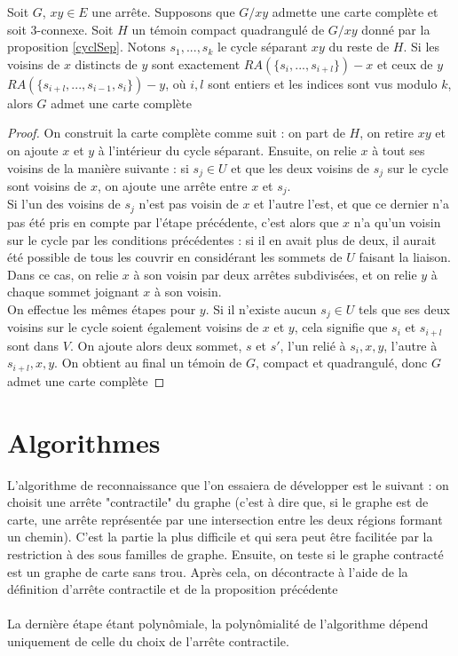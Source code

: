 \documentclass{scrartcl}
\begin{document}
\begin{flushleft}
\begin{prop}\label{ezDecontr}
    Soit $G$, $xy \in E$ une arrête. Supposons que $G / xy$ admette une carte complète et soit $3$-connexe. Soit $H$ un témoin compact
    quadrangulé de $G / xy$ donné par la proposition \ref{cyclSep}. Notons $s_1, ..., s_k$ le cycle séparant $xy$ du reste de $H$.
    Si les voisins de $x$ distincts de $y$ sont exactement $RA(\{s_i, ..., s_{i+l}\}) - x$ et ceux de $y$
    $RA(\{s_{i+l}, ..., s_{i-1}, s_i\}) - y$,
    où $i, l$ sont entiers et les indices sont vus modulo $k$, alors $G$ admet une carte complète
\end{prop}

\begin{proof}
    On construit la carte complète comme suit : on part de $H$, on retire $xy$ et on ajoute $x$ et $y$ à l'intérieur du cycle séparant.
    Ensuite, on relie $x$ à tout ses voisins de la manière suivante : si $s_j \in U$ et que les deux voisins de $s_j$ sur le cycle
    sont voisins de $x$, on ajoute une arrête entre $x$ et $s_j$.\\
    Si l'un des voisins de $s_j$ n'est pas voisin de $x$ et l'autre l'est,
    et que ce dernier n'a pas été pris en compte par l'étape précédente, c'est alors que $x$ n'a qu'un voisin sur le cycle par
    les conditions précédentes : si il en avait plus de deux, il aurait été possible de tous les couvrir en considérant les sommets
    de $U$ faisant la liaison. Dans ce cas, on relie $x$ à son voisin par deux arrêtes subdivisées, et on relie $y$ à chaque sommet
    joignant $x$ à son voisin.\\
    On effectue les mêmes étapes pour $y$. Si il n'existe aucun $s_j \in U$ tels que ses deux voisins sur le cycle soient également
    voisins de $x$ et $y$, cela signifie que $s_i$ et $s_{i+l}$ sont dans $V$. On ajoute alors deux sommet, $s$ et $s'$, l'un relié
    à $s_i, x, y$, l'autre à $s_{i+l}, x, y$. On obtient au final un témoin de $G$, compact et quadrangulé, donc $G$ admet une carte
    complète
\end{proof}

\section{Algorithmes}

L'algorithme de reconnaissance que l'on essaiera de développer est le suivant : on choisit une arrête "contractile" du graphe
(c'est à dire que, si le graphe est de carte, une arrête représentée par une intersection entre les deux régions formant
un chemin). C'est la partie la plus difficile et qui sera peut être facilitée par la restriction à des sous familles de graphe.
Ensuite, on teste si le graphe contracté est un graphe de carte sans trou. Après cela, on décontracte à l'aide de la définition
d'arrête contractile et de la proposition précédente
\\~\\
La dernière étape étant polynômiale, la polynômialité de l'algorithme dépend uniquement de celle du choix de l'arrête contractile.


\end{flushleft}
\end{document}
